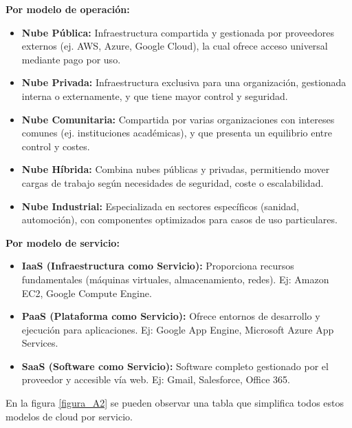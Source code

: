 \begin{enumerate}
	\textbf{Por modelo de operación:}
		\begin{itemize}
			\item \textbf{Nube Pública:} Infraestructura compartida y gestionada por proveedores externos (ej. AWS, Azure, Google Cloud), la cual ofrece acceso universal mediante pago por uso.
			\item \textbf{Nube Privada:} Infraestructura exclusiva para una organización, gestionada interna o externamente, y que tiene mayor control y seguridad.
			\item \textbf{Nube Comunitaria:} Compartida por varias organizaciones con intereses comunes (ej. instituciones académicas), y que presenta un equilibrio entre control y costes.
			\item \textbf{Nube Híbrida:} Combina nubes públicas y privadas, permitiendo mover cargas de trabajo según necesidades de seguridad, coste o escalabilidad.
			\item \textbf{Nube Industrial:} Especializada en sectores específicos (sanidad, automoción), con componentes optimizados para casos de uso particulares.
		\end{itemize}
		
		\textbf{Por modelo de servicio:}
		\begin{itemize}
			\item \textbf{IaaS (Infraestructura como Servicio):} Proporciona recursos fundamentales (máquinas virtuales, almacenamiento, redes). Ej: Amazon EC2, Google Compute Engine.
			\item \textbf{PaaS (Plataforma como Servicio):} Ofrece entornos de desarrollo y ejecución para aplicaciones. Ej: Google App Engine, Microsoft Azure App Services.
			\item \textbf{SaaS (Software como Servicio):} Software completo gestionado por el proveedor y accesible vía web. Ej: Gmail, Salesforce, Office 365.
		\end{itemize}
		
		En la figura \ref{figura_A2} se pueden observar una tabla que simplifica todos estos modelos de cloud por servicio.
		

\end{enumerate}
